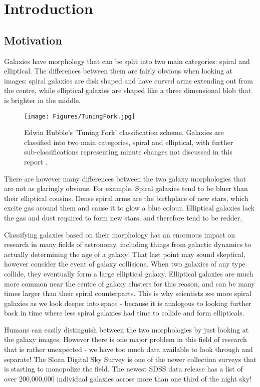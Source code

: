 \section{Introduction}
\label{sec:intro}
\subsection{Motivation}
Galaxies have morphology that can be split into two main categories: spiral and elliptical. 
The differences between them are fairly obvious when looking at images: spiral galaxies are disk shaped and have curved arms extending out from the centre, while elliptical galaxies are shaped like a three dimensional blob that is brighter in the middle. 

\begin{figure}[h]
	\centering
	\captionsetup{justification=centering,width=.8\linewidth}
	\texttt{[image: Figures/TuningFork.jpg]}
	\caption{Edwin Hubble's 'Tuning Fork' classification scheme. Galaxies are classified into two main categories, spiral and elliptical, with further sub-classifications representing minute changes not discussed in this report \cite{TuningFork}.}
	\label{fig:tuningfork}
\end{figure}


There are however many differences between the two galaxy morphologies that are not as glaringly obvious.  
For example, Spiral galaxies tend to be bluer than their elliptical cousins. 
Dense spiral arms are the birthplace of new stars, which excite gas around them and cause it to glow a blue colour. 
Elliptical galaxies lack the gas and dust required to form new stars, and therefore tend to be redder.

Classifying galaxies based on their morphology has an enormous impact on research in many fields of astronomy, including things from galactic dynamics to actually determining the age of a galaxy!
That last point may sound skeptical, however consider the event of galaxy collisions.
When two galaxies of any type collide, they eventually form a large elliptical galaxy. 
Elliptical galaxies are much more common near the centre of galaxy clusters for this reason, and can be many times larger than their spiral counterparts.
This is why scientists see more spiral galaxies as we look deeper into space - because it is analogous to looking further back in time where less spiral galaxies had time to collide and form ellipticals. 


Humans can easily distinguish between the two morphologies by just looking at the galaxy images. 
However there is one major problem in this field of research that is rather unexpected - we have too much data available to look through and separate! 
The Sloan Digital Sky Survey is one of the newer collection surveys that is starting to monopolize the field. The newest SDSS data release has a list of over 200,000,000 individual galaxies across more than one third of the night sky\cite{SDSS}!

